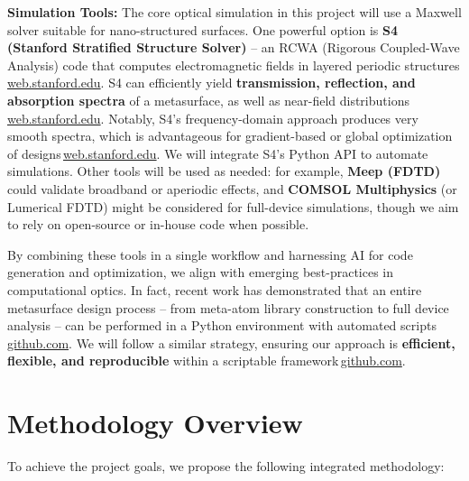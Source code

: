 \documentclass[11pt]{article}
\begin{document}
\textbf{Simulation Tools:} The core optical simulation in this project will use a Maxwell solver suitable for nano-structured surfaces. One powerful option is \textbf{S4 (Stanford Stratified Structure Solver)} -- an RCWA (Rigorous Coupled-Wave Analysis) code that computes electromagnetic fields in layered periodic structures\,\href{https://web.stanford.edu/group/fan/S4/#:~:text=S,the%20Stanford%20Electrical%20Engineering%20Department}{web.stanford.edu}. S4 can efficiently yield \textbf{transmission, reflection, and absorption spectra} of a metasurface, as well as near-field distributions\,\href{https://web.stanford.edu/group/fan/S4/#:~:text=What%20can%20it%20compute%3F%E2%80%B6}{web.stanford.edu}. Notably, S4's frequency-domain approach produces very smooth spectra, which is advantageous for gradient-based or global optimization of designs\,\href{https://web.stanford.edu/group/fan/S4/#:~:text=What%20can%20it%20compute%3F%E2%80%B6}{web.stanford.edu}. We will integrate S4's Python API to automate simulations. Other tools will be used as needed: for example, \textbf{Meep (FDTD)} could validate broadband or aperiodic effects, and \textbf{COMSOL Multiphysics} (or Lumerical FDTD) might be considered for full-device simulations, though we aim to rely on open-source or in-house code when possible.

By combining these tools in a single workflow and harnessing AI for code generation and optimization, we align with emerging best-practices in computational optics. In fact, recent work has demonstrated that an entire metasurface design process -- from meta-atom library construction to full device analysis -- can be performed in a Python environment with automated scripts\,\href{https://github.com/hzzg0727/Metasurface-Design#:~:text=A%20major%20advantage%20of%20the,flexible%2C%20convenient%2C%20and%20automated%20workflow}{github.com}. We will follow a similar strategy, ensuring our approach is \textbf{efficient, flexible, and reproducible} within a scriptable framework\,\href{https://github.com/hzzg0727/Metasurface-Design#:~:text=A%20major%20advantage%20of%20the,flexible%2C%20convenient%2C%20and%20automated%20workflow}{github.com}.

\section{Methodology Overview}

To achieve the project goals, we propose the following integrated methodology:
\end{document}
